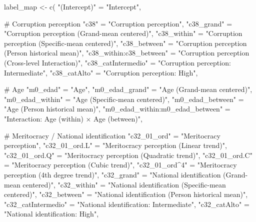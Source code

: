 \documentclass[
  spanish,
  a4paper,
  oneside]{scrbook}
\newenvironment{Shaded}{\begin{snugshade}}{\end{snugshade}}
\newcommand{\CommentTok}[1]{\textcolor[rgb]{0.37,0.37,0.37}{#1}}
\newcommand{\FunctionTok}[1]{\textcolor[rgb]{0.28,0.35,0.67}{#1}}
\newcommand{\NormalTok}[1]{\textcolor[rgb]{0.00,0.23,0.31}{#1}}
\newcommand{\OtherTok}[1]{\textcolor[rgb]{0.00,0.23,0.31}{#1}}
\newcommand{\StringTok}[1]{\textcolor[rgb]{0.13,0.47,0.30}{#1}}
\begin{document}
\begin{Shaded}
\begin{Highlighting}[]
\NormalTok{label\_map }\OtherTok{\textless{}{-}} \FunctionTok{c}\NormalTok{(}
  \StringTok{"(Intercept)"}            \OtherTok{=} \StringTok{"Intercept"}\NormalTok{,}
  
  \CommentTok{\# Corruption perception}
  \StringTok{"c38"}                    \OtherTok{=} \StringTok{"Corruption perception"}\NormalTok{,}
  \StringTok{"c38\_grand"}              \OtherTok{=} \StringTok{"Corruption perception (Grand{-}mean centered)"}\NormalTok{,}
  \StringTok{"c38\_within"}             \OtherTok{=} \StringTok{"Corruption perception (Specific{-}mean centered)"}\NormalTok{,}
  \StringTok{"c38\_between"}            \OtherTok{=} \StringTok{"Corruption perception (Person historical mean)"}\NormalTok{,}
  \StringTok{"c38\_within:c38\_between"} \OtherTok{=} \StringTok{"Corruption perception (Cross{-}level Interaction)"}\NormalTok{,}
  \StringTok{"c38\_catIntermedio"}      \OtherTok{=} \StringTok{"Corruption perception: Intermediate"}\NormalTok{,}
  \StringTok{"c38\_catAlto"}            \OtherTok{=} \StringTok{"Corruption perception: High"}\NormalTok{,}

  \CommentTok{\# Age}
  \StringTok{"m0\_edad"}                \OtherTok{=} \StringTok{"Age"}\NormalTok{,}
  \StringTok{"m0\_edad\_grand"}          \OtherTok{=} \StringTok{"Age (Grand{-}mean centered)"}\NormalTok{,}
  \StringTok{"m0\_edad\_within"}         \OtherTok{=} \StringTok{"Age (Specific{-}mean centered)"}\NormalTok{,}
  \StringTok{"m0\_edad\_between"}        \OtherTok{=} \StringTok{"Age (Person historical mean)"}\NormalTok{,}
  \StringTok{"m0\_edad\_within:m0\_edad\_between"} \OtherTok{=} \StringTok{"Interaction: Age (within) × Age (between)"}\NormalTok{,}

  \CommentTok{\# Meritocracy / National identification}
  \StringTok{"c32\_01\_ord"}             \OtherTok{=} \StringTok{"Meritocracy perception"}\NormalTok{,}
  \StringTok{"c32\_01\_ord.L"}           \OtherTok{=} \StringTok{"Meritocracy perception (Linear trend)"}\NormalTok{,}
  \StringTok{"c32\_01\_ord.Q"}           \OtherTok{=} \StringTok{"Meritocracy perception (Quadratic trend)"}\NormalTok{,}
  \StringTok{"c32\_01\_ord.C"}           \OtherTok{=} \StringTok{"Meritocracy perception (Cubic trend)"}\NormalTok{,}
  \StringTok{"c32\_01\_ord\^{}4"}           \OtherTok{=} \StringTok{"Meritocracy perception (4th degree trend)"}\NormalTok{,}
  \StringTok{"c32\_grand"}              \OtherTok{=} \StringTok{"National identification (Grand{-}mean centered)"}\NormalTok{,}
  \StringTok{"c32\_within"}             \OtherTok{=} \StringTok{"National identification (Specific{-}mean centered)"}\NormalTok{,}
  \StringTok{"c32\_between"}            \OtherTok{=} \StringTok{"National identification (Person historical mean)"}\NormalTok{,}
  \StringTok{"c32\_catIntermedio"}      \OtherTok{=} \StringTok{"National identification: Intermediate"}\NormalTok{,}
  \StringTok{"c32\_catAlto"}            \OtherTok{=} \StringTok{"National identification: High"}\NormalTok{,}


\end{Highlighting}
\end{Shaded}
\end{document}
